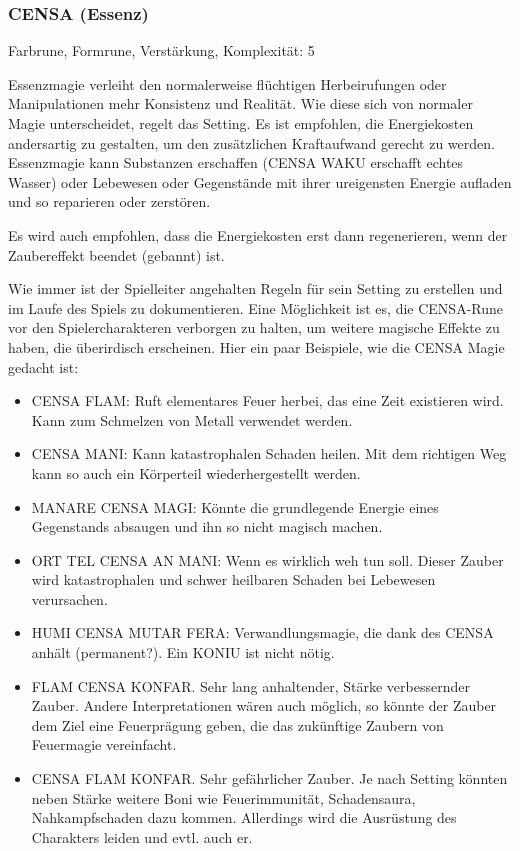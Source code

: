 \documentclass{article}
\begin{document}
\subsubsection{CENSA (Essenz)}

Farbrune, Formrune, Verstärkung, Komplexität: 5

Essenzmagie verleiht den normalerweise flüchtigen Herbeirufungen oder Manipulationen mehr Konsistenz und Realität. Wie
diese sich von normaler Magie unterscheidet, regelt das Setting. Es ist empfohlen, die Energiekosten andersartig zu
gestalten, um den zusätzlichen Kraftaufwand gerecht zu werden. Essenzmagie kann Substanzen erschaffen (CENSA WAKU
erschafft echtes Wasser) oder Lebewesen oder Gegenstände mit ihrer ureigensten Energie aufladen und so reparieren oder
zerstören.

Es wird auch empfohlen, dass die Energiekosten erst dann regenerieren, wenn der Zaubereffekt beendet (gebannt) ist.

Wie immer ist der Spielleiter angehalten Regeln für sein Setting zu erstellen und im Laufe des Spiels zu dokumentieren.
Eine Möglichkeit ist es, die CENSA-Rune vor den Spielercharakteren verborgen zu halten, um weitere magische Effekte zu
haben, die überirdisch erscheinen. Hier ein paar Beispiele, wie die CENSA Magie gedacht ist:

\begin{itemize}
\item CENSA FLAM: Ruft elementares Feuer herbei, das eine Zeit existieren wird. Kann zum Schmelzen von Metall verwendet werden.
\item CENSA MANI: Kann katastrophalen Schaden heilen. Mit dem richtigen Weg kann so auch ein Körperteil wiederhergestellt werden.
\item MANARE CENSA MAGI: Könnte die grundlegende Energie eines Gegenstands absaugen und ihn so nicht magisch machen.
\item ORT TEL CENSA AN MANI: Wenn es wirklich weh tun soll. Dieser Zauber wird katastrophalen und schwer heilbaren Schaden bei Lebewesen verursachen.
\item HUMI CENSA MUTAR FERA: Verwandlungsmagie, die dank des CENSA anhält (permanent?). Ein KONIU ist nicht nötig.
\item FLAM CENSA KONFAR. Sehr lang anhaltender, Stärke verbessernder Zauber. Andere Interpretationen wären auch möglich, so könnte der Zauber dem Ziel eine Feuerprägung geben, die das zukünftige Zaubern von Feuermagie vereinfacht.
\item CENSA FLAM KONFAR. Sehr gefährlicher Zauber. Je nach Setting könnten neben Stärke weitere Boni wie Feuerimmunität, Schadensaura, Nahkampfschaden dazu kommen. Allerdings wird die Ausrüstung des Charakters leiden und evtl. auch er.
\end{itemize}
\end{document}
